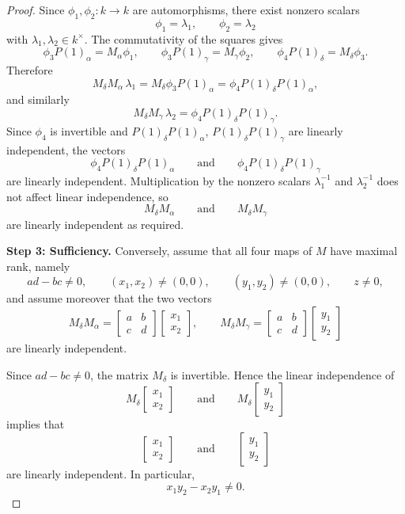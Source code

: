 \documentclass[11pt, a4paper]{article}
\begin{document}
\begin{enumerate}[leftmargin=*, label=\textbf{\arabic*.}]
\begin{proof}
    Since \(\phi_1,\phi_2\colon k\to k\) are automorphisms, there exist nonzero scalars
    \[
    \phi_1=\lambda_1,\qquad \phi_2=\lambda_2
    \]
    with \(\lambda_1,\lambda_2\in k^\times\). The commutativity of the squares gives
    \[
    \phi_3 P(1)_\alpha=M_\alpha\phi_1,
    \qquad
    \phi_3 P(1)_\gamma=M_\gamma\phi_2,
    \qquad
    \phi_4 P(1)_\delta=M_\delta\phi_3.
    \]
    Therefore
    \[
    M_\delta M_\alpha\,\lambda_1
    =
    M_\delta\phi_3P(1)_\alpha
    =
    \phi_4P(1)_\delta P(1)_\alpha,
    \]
    and similarly
    \[
    M_\delta M_\gamma\,\lambda_2
    =
    \phi_4P(1)_\delta P(1)_\gamma.
    \]
    Since \(\phi_4\) is invertible and \(P(1)_\delta P(1)_\alpha\), \(P(1)_\delta P(1)_\gamma\) are linearly independent, the vectors
    \[
    \phi_4P(1)_\delta P(1)_\alpha
    \qquad\text{and}\qquad
    \phi_4P(1)_\delta P(1)_\gamma
    \]
    are linearly independent. Multiplication by the nonzero scalars \(\lambda_1^{-1}\) and \(\lambda_2^{-1}\) does not affect linear independence, so
    \[
    M_\delta M_\alpha
    \qquad\text{and}\qquad
    M_\delta M_\gamma
    \]
    are linearly independent as required.
    
    \medskip
    \noindent\textbf{Step 3: Sufficiency.}
    Conversely, assume that all four maps of \(M\) have maximal rank, namely
    \[
    ad-bc\neq 0,\qquad
    (x_1,x_2)\neq (0,0),\qquad
    (y_1,y_2)\neq (0,0),\qquad
    z\neq 0,
    \]
    and assume moreover that the two vectors
    \[
    M_\delta M_\alpha=
    \begin{bmatrix}a&b\\c&d\end{bmatrix}\begin{bmatrix}x_1\\x_2\end{bmatrix},
    \qquad
    M_\delta M_\gamma=
    \begin{bmatrix}a&b\\c&d\end{bmatrix}\begin{bmatrix}y_1\\y_2\end{bmatrix}
    \]
    are linearly independent.
    
    Since \(ad-bc\neq 0\), the matrix \(M_\delta\) is invertible. Hence the linear independence of
    \[
    M_\delta\begin{bmatrix}x_1\\x_2\end{bmatrix}
    \qquad\text{and}\qquad
    M_\delta\begin{bmatrix}y_1\\y_2\end{bmatrix}
    \]
    implies that
    \[
    \begin{bmatrix}x_1\\x_2\end{bmatrix}
    \qquad\text{and}\qquad
    \begin{bmatrix}y_1\\y_2\end{bmatrix}
    \]
    are linearly independent. In particular,
    \[
    x_1y_2-x_2y_1\neq 0.
    \]
    

\end{proof}
\end{enumerate}
\end{document}
